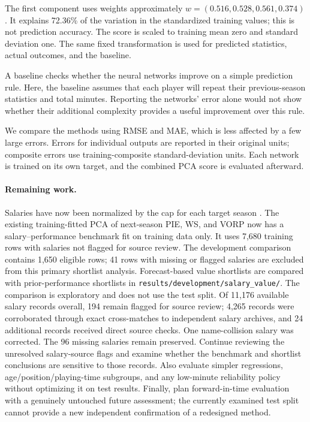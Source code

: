 \documentclass{article}
\begin{document}
The first component uses weights approximately $w=(0.516,0.528,0.561,0.374)$.
It explains 72.36\% of the variation in the standardized training values; this
is not prediction accuracy. The score is scaled to training mean zero and
standard deviation one. The same fixed transformation is used for predicted
statistics, actual outcomes, and the baseline.

A baseline checks whether the neural networks improve on a simple prediction
rule. Here, the baseline assumes that each player will repeat their
previous-season statistics and total minutes. Reporting the networks' error
alone would not show whether their additional complexity provides a useful
improvement over this rule.

We compare the methods using RMSE and MAE, which is less affected by a few large
errors. Errors for individual outputs are reported in their original units;
composite errors use training-composite standard-deviation units. Each network
is trained on its own target, and the combined PCA score is evaluated afterward.

\paragraph{Remaining work.}
Salaries have now been normalized by the cap for each target season \cite{basketballreferencecap2026}.
The existing training-fitted PCA of next-season PIE, WS, and VORP now has a
salary--performance benchmark fit on training data only. It uses 7,680 training
rows with salaries not flagged for source review. The development comparison
contains 1,650 eligible rows; 41 rows with missing or flagged salaries are
excluded from this primary shortlist analysis. Forecast-based value shortlists
are compared with prior-performance shortlists in
\texttt{results/development/salary\_value/}. The comparison is exploratory and
does not use the test split. Of 11,176 available salary records overall, 194
remain flagged for source review; 4,265 records were corroborated through exact
cross-matches to independent salary archives, and 24 additional records received
direct source checks. One name-collision salary was corrected. The 96 missing
salaries remain preserved. Continue reviewing the unresolved salary-source flags
and examine whether the benchmark and shortlist conclusions
are sensitive to those records. Also evaluate simpler regressions,
age/position/playing-time subgroups, and any low-minute reliability policy
without optimizing it on test results. Finally, plan forward-in-time
evaluation with a genuinely untouched future assessment; the currently examined
test split cannot provide a new independent confirmation of a redesigned method.
\end{document}
